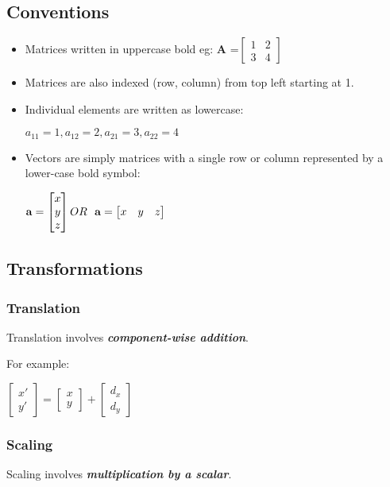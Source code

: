 \documentclass{article}\author{Hawley, Adam}
\begin{document}
\subsection{Conventions}
\begin{itemize}
	\item Matrices written in uppercase bold eg:
{\bf A} =$ 
\begin{bmatrix}
1&2\\
3&4
\end{bmatrix}
$
\item Matrices are also indexed (row, column) from top left starting at 1.
\item Individual elements are written as lowercase: 
	\\  \centerline{ $ a_{11} = 1, a_{12} = 2, a_{21} = 3, a_{22} = 4 $ }
\item Vectors are simply matrices with a single row or column represented by a lower-case bold symbol:

	\centerline{ $ {\bf a} = 
		\begin{bmatrix}
			x\\y\\z
		\end{bmatrix} OR \ \ {\bf a} = 
		\begin{bmatrix}
			x&y&z
		\end{bmatrix}
	$ }
\end{itemize}

\subsection{Transformations}
\subsubsection{Translation}
Translation involves {\textbf{\textit{component-wise addition}}}.

For example: \\
\centerline{$
\begin{bmatrix}
	x' \\ y'
\end{bmatrix}
=
\begin{bmatrix}
	x \\ y
\end{bmatrix}
+
\begin{bmatrix}
	d_x \\ d_y
\end{bmatrix}
$}
\subsubsection{Scaling}
Scaling involves {\textbf{\textit{multiplication by a scalar}}}.
\end{document}

